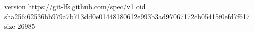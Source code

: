 version https://git-lfs.github.com/spec/v1
oid sha256:62536bb979a7b713dd0e01448180612e993b3ad97067172cb05415f0efd7f617
size 26985
